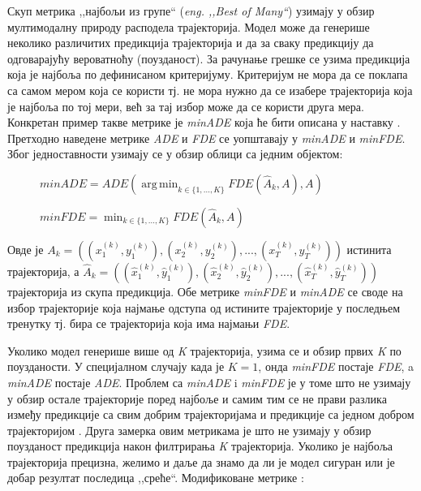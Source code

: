 \documentclass[11pt,oneside]{memoir}
\DeclareMathOperator*{\argmin}{arg\,min}
\begin{document}
Скуп метрика ,,најбољи из групе`` (\textit{eng. ,,Best of Many``}) узимају у обзир мултимодалну природу расподела трајекторија. Модел може
да генерише неколико различитих предикција трајекторија и да за сваку предикцију да одговарајућу вероватноћу (поузданост). 
За рачунање грешке се узима предикција која је најбоља по дефинисаном критеријуму. Критеријум не мора да се поклапа са самом мером која се користи 
тј. не мора нужно да се изабере трајекторија која је најбоља по тој мери, већ за тај избор може да се користи друга мера. 
Конкретан пример такве метрике је \textit{minADE} која ће бити описана у наставку \cite{best_of_many_cvae, argoverse}. 
Претходно наведене метрике \textit{ADE} и \textit{FDE} се уопштавају у \textit{minADE} и \textit{minFDE}. Због једноставности узимају се у обзир облици
са једним објектом: \cite{Disdis, best_of_many_cvae}

\begin{figure}[H]
  \centering
  $minADE = ADE(\displaystyle\argmin_{k \in \{1, ..., K\}} FDE(\hat{A}_k, A), A)$
\end{figure}

\begin{figure}[H]
  \centering
  $minFDE = \displaystyle\min_{k \in \{1, ..., K\}} FDE(\hat{A}_k, A)$
\end{figure}

Овде је $A_k = ((x^{(k)}_1, y^{(k)}_1), (x^{(k)}_2, y^{(k)}_2), ...,  (x^{(k)}_T, y^{(k)}_T))$ истинита трајекторија, а 
$\hat{A}_k = ((\hat{x}^{(k)}_1, \hat{y}^{(k)}_1), (\hat{x}^{(k)}_2, \hat{y}^{(k)}_2), ...,  (\hat{x}^{(k)}_T, \hat{y}^{(k)}_T))$ 
трајекторија из скупа предикција. Обе метрике \textit{minFDE} и \textit{minADE} 
се своде на избор трајекторије која најмање одступа од истините трајекторије у последњем тренутку тј. бира се трајекторија која има најмањи \textit{FDE}.

Уколико модел генерише више од \textit{K} трајекторија, узима се и обзир првих \textit{K} по поузданости. У специјалном случају када је $K = 1$, онда 
\textit{minFDE} постаје \textit{FDE}, a \textit{minADE} постаје \textit{ADE}. 
Проблем са \textit{minADE} i \textit{minFDE} је у томе што не узимају у обзир остале трајекторије поред најбоље и самим тим се не прави разлика
између предикције са свим добрим трајекторијама и предикције са једном добром трајекторијом \cite{Disdis}. 
Друга замерка овим метрикама је што не узимају у обзир поузданост предикција након филтрирања \textit{K} трајекторија. Уколико је најбоља трајекторија
прецизна, желимо и даље да знамо да ли је модел сигуран или је добар резултат последица ,,среће``. Модификоване метрике \cite{home}: 
\end{document}

